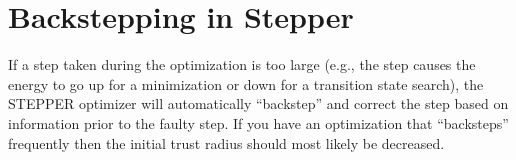 %
%
%
%
%


\section{Backstepping in Stepper}
\label{sec:stepper:backstep}
If a step taken during the optimization is too large (e.g., the step
causes the energy to go up for a minimization or down for a transition
state search), the STEPPER optimizer will automatically ``backstep''
and correct the step based on information prior to the faulty step.
If you have an optimization that ``backsteps'' frequently then the
initial trust radius should most likely be decreased.



